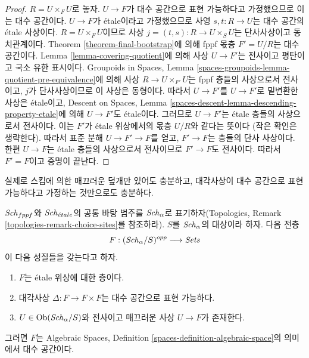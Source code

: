 \begin{proof}
$R = U \times_F U$로 놓자. $U \to F$가 대수 공간으로 표현
가능하다고 가정했으므로 이는 대수 공간이다.
$U \to F$가 \'etale이라고 가정했으므로 사영
$s, t : R \to U$는 대수 공간의 \'etale 사상이다.
$R = U \times_F U$이므로 사상
$j = (t, s) : R \to U \times_S U$는 단사사상이고 동치관계이다.
Theorem \ref{theorem-final-bootstrap}에 의해 fppf 몫층
$F' = U/R$는 대수 공간이다.
Lemma \ref{lemma-covering-quotient}에 의해 사상 $U \to F'$는
전사이고 평탄이고 국소 유한 표시이다.
Groupoids in Spaces, Lemma
\ref{spaces-groupoids-lemma-quotient-pre-equivalence}에 의해
사상 $R \to U \times_{F'} U$는 fppf 층들의 사상으로서 전사이고,
$j$가 단사사상이므로 이 사상은 동형이다.
따라서 $U \to F'$를 $U \to F'$로 밑변환한 사상은 \'etale이고,
Descent on Spaces, Lemma
\ref{spaces-descent-lemma-descending-property-etale}에 의해
$U \to F'$도 \'etale이다.
그러므로 $U \to F'$는 \'etale 층들의 사상으로서 전사이다.
이는 $F'$가 \'etale 위상에서의 몫층 $U/R$와 같다는 뜻이다
(작은 확인은 생략한다). 따라서 표준 분해
$U \to F' \to F$를 얻고, $F' \to F$는 층들의 단사 사상이다.
한편 $U \to F$는 \'etale 층들의 사상으로서 전사이므로
$F' \to F$도 전사이다. 따라서 $F' = F$이고 증명이 끝난다.
\end{proof}

\noindent
실제로 스킴에 의한 매끄러운 덮개만 있어도 충분하고,
대각사상이 대수 공간으로 표현 가능하다고 가정하는 것만으로도
충분하다.

\begin{lemma}
\label{lemma-spaces-etale-smooth-cover}
$\mathit{Sch}_{fppf}$와 $\mathit{Sch}_{\acute{e}tale}$의 공통 바탕 범주를
$\mathit{Sch}_\alpha$로 표기하자(Topologies, Remark
\ref{topologies-remark-choice-sites}를 참조하라).
$S$를 $\mathit{Sch}_\alpha$의 대상이라 하자.
다음 전층
$$
F : (\mathit{Sch}_\alpha/S)^{opp} \longrightarrow \textit{Sets}
$$
이 다음 성질들을 갖는다고 하자.
\begin{enumerate}
\item $F$는 \'etale 위상에 대한 층이다.
\item 대각사상 $\Delta : F \to F \times F$는 대수 공간으로
표현 가능하다.
\item $U \in \mathop{\mathrm{Ob}}\nolimits(\mathit{Sch}_\alpha/S)$와 전사이고 매끄러운 사상
$U \to F$가 존재한다.
\end{enumerate}
그러면 $F$는 Algebraic Spaces, Definition
\ref{spaces-definition-algebraic-space}의 의미에서 대수 공간이다.
\end{lemma}

